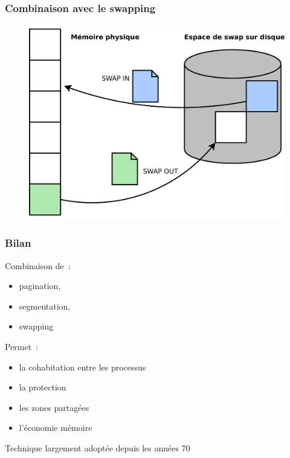 \begin{frame}
  \frametitle{Combinaison avec le swapping}
  \begin{figure}
    \includegraphics[width=0.8\linewidth]{fig2/swapping}
  \end{figure}
\end{frame}

\begin{frame}
  \frametitle{Bilan}
  Combinaison de~:
  \begin{itemize}
  \item pagination, 
  \item segmentation, 
  \item swapping
  \end{itemize}
  \vspace{0.5cm}
  
  Permet~:
  \begin{itemize}
  \item la cohabitation entre les processus
  \item la protection
  \item les zones partagées
  \item l'économie mémoire
  \end{itemize}
  \vspace{0.5cm}
  
  Technique largement adoptée depuis les années 70
\end{frame}



